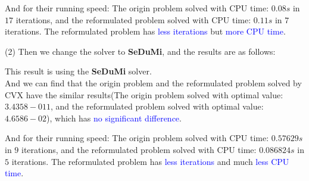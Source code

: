 And for their running speed: The origin problem solved with CPU time: $0.08s$ in $17$ iterations, and the reformulated problem solved with CPU time: $0.11s$ in $7$ iterations. The reformulated problem has \textcolor{blue}{less iterations} but \textcolor{blue}{more CPU time}.

(2) Then we change the solver to \textbf{SeDuMi}, and the results are as follows:

This result is using the \textbf{SeDuMi} solver. \\
And we can find that the origin problem and the reformulated problem solved by CVX have the similar results(The origin problem solved with optimal value: $3.4358 -011$, and the reformulated problem solved with optimal value: $4.6586 -02$), which has \textcolor{blue}{no significant difference}.

And for their running speed: The origin problem solved with CPU time: $0.57629s$ in $9$ iterations, and the reformulated problem solved with CPU time: $0.086824s$ in $5$ iterations. The reformulated problem has \textcolor{blue}{less iterations} and much \textcolor{blue}{less CPU time}.

\newpage
